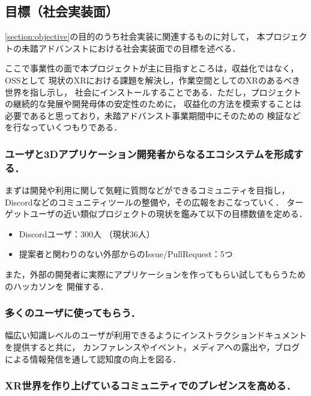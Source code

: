 \subsection{目標（社会実装面）}

\ref{section:objective}の目的のうち社会実装に関連するものに対して，
本プロジェクトの未踏アドバンストにおける社会実装面での目標を述べる．

ここで事業性の面で本プロジェクトが主に目指すところは，収益化ではなく，OSSとして
現状のXRにおける課題を解決し，作業空間としてのXRのあるべき世界を指し示し，
社会にインストールすることである．ただし，プロジェクトの継続的な発展や開発母体の安定性のために，
収益化の方法を模索することは必要であると思っており，未踏アドバンスト事業期間中にそのための
検証などを行なっていくつもりである．

\subsubsection*{ユーザと3Dアプリケーション開発者からなるエコシステムを形成する．}

まずは開発や利用に関して気軽に質問などができるコミュニティを目指し，
Discordなどのコミュニティツールの整備や，その広報をおこなっていく．
ターゲットユーザの近い類似プロジェクトの現状を鑑みて以下の目標数値を定める．

\begin{itemize}
  \item Discordユーザ：300人 （現状36人）
  \item 提案者と関わりのない外部からのIssue/PullRequest：5つ
\end{itemize}

また，外部の開発者に実際にアプリケーションを作ってもらい試してもらうためのハッカソンを
開催する．

\subsubsection*{多くのユーザに使ってもらう．}

幅広い知識レベルのユーザが利用できるようにインストラクションドキュメントを提供すると共に，
カンファレンスやイベント，メディアへの露出や，ブログによる情報発信を通して認知度の向上を図る．

\subsubsection*{XR世界を作り上げているコミュニティでのプレゼンスを高める．}

